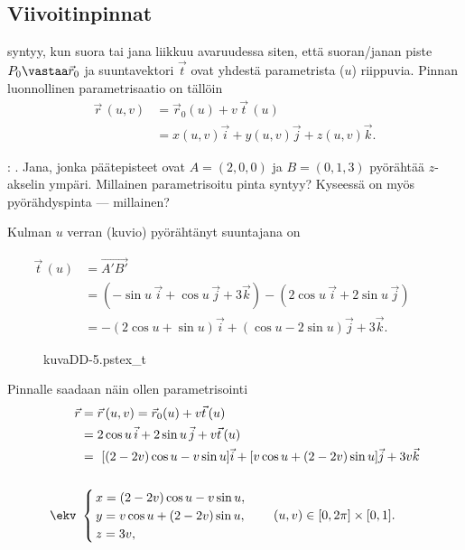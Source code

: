 \subsection{Viivoitinpinnat}

 syntyy, kun suora tai jana liikkuu avaruudessa siten, että suoran/janan
piste $P_0\vastaa\vec r_0$ ja suuntavektori $\vec t$ ovat yhdestä parametrista ($u$) riippuvia.
Pinnan luonnollinen parametrisaatio on tällöin
\begin{align*}
\vec r\,(u,v) &= \vec r_0(u)+v\,\vec t\,(u) \\
              &= x(u,v)\vec i +y(u,v)\vec j+z(u,v)\vec k.
\end{align*}
%
\begin{Exa}: . \label{jäähdytystorni}
Jana, jonka päätepisteet ovat $A=(2,0,0)$ ja $B=(0,1,3)$ pyörähtää $z$-akselin ympäri.
Millainen parametrisoitu pinta syntyy? Kyseessä on myös pyörähdyspinta --- millainen?
\end{Exa}
\ratk Kulman $u$ verran (kuvio) pyörähtänyt suuntajana on
\begin{multicols}{2} \raggedcolumns
\begin{align*}
\vec t\,(u) 
&= \overrightarrow{A'B'} \\
&= (-\sin u\,\vec i + \cos u\,\vec j + 3\vec k) -(2\cos u\,\vec i + 2\sin u\, \vec j) \qquad \\
&=-(2\cos u+\sin u)\vec i + (\cos u-2\sin u)\vec j +3\vec k.
\end{align*}
\begin{figure}[H]
\begin{center}
{kuvaDD-5.pstex_t}
\end{center}
\end{figure}
\end{multicols}
Pinnalle saadaan näin ollen parametrisointi
\begin{align*}
\vec r
&= \vec r\,(u,v)=\vec r_0(u)+v\vec t\,(u) \\
&= 2\cos u\,\vec i+2\sin u\,\vec j +v\vec t\,(u) \\
&= [(2-2v)\cos u-v\sin u]\vec i+[v\cos u +(2-2v)\sin u]\vec j+3v\vec k \\ \\
\ekv \ &\begin{cases}
\,x=(2-2v)\cos u-v\sin u, \\
\,y=v\cos u+(2-2v)\sin u, \\
\,z=3v,
\end{cases} \quad (u,v) \in [0,2\pi] \times [0,1].
\end{align*}
